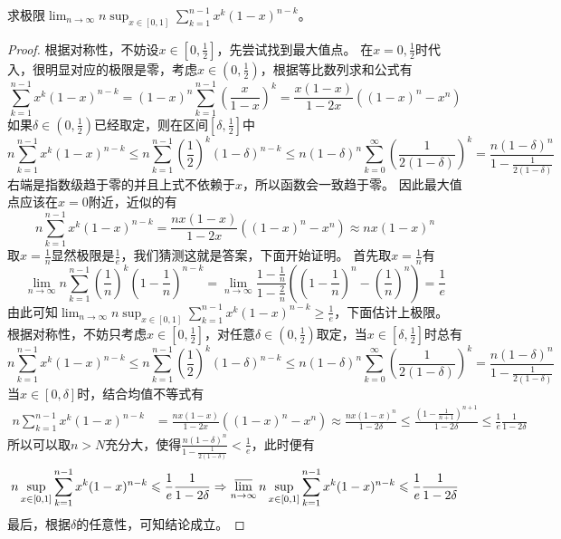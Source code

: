 \documentclass[../../main.tex]{subfiles}%
\begin{document}
\begin{example}
求极限\(\lim_{n\rightarrow\infty}n\sup_{x\in[0,1]}\sum_{k = 1}^{n - 1}x^{k}(1 - x)^{n - k}\)。
\end{example}
\begin{proof}
根据对称性，不妨设\(x\in\left[0,\frac{1}{2}\right]\)，先尝试找到最大值点。
在\(x = 0,\frac{1}{2}\)时代入，很明显对应的极限是零，考虑\(x\in\left(0,\frac{1}{2}\right)\)，根据等比数列求和公式有
\[
\sum_{k = 1}^{n - 1}x^{k}(1 - x)^{n - k}=(1 - x)^{n}\sum_{k = 1}^{n - 1}\left(\frac{x}{1 - x}\right)^{k}=\frac{x(1 - x)}{1 - 2x}((1 - x)^{n}-x^{n})
\]
如果\(\delta\in\left(0,\frac{1}{2}\right)\)已经取定，则在区间\(\left[\delta,\frac{1}{2}\right]\)中
\[
n\sum_{k = 1}^{n - 1}x^{k}(1 - x)^{n - k}\leqslant  n\sum_{k = 1}^{n - 1}\left(\frac{1}{2}\right)^{k}(1 - \delta)^{n - k}\leqslant  n(1 - \delta)^{n}\sum_{k = 0}^{\infty}\left(\frac{1}{2(1 - \delta)}\right)^{k}=\frac{n(1 - \delta)^{n}}{1-\frac{1}{2(1 - \delta)}}
\]
右端是指数级趋于零的并且上式不依赖于\(x\)，所以函数会一致趋于零。
因此最大值点应该在\(x = 0\)附近，近似的有
\[
n\sum_{k = 1}^{n - 1}x^{k}(1 - x)^{n - k}=\frac{nx(1 - x)}{1 - 2x}((1 - x)^{n}-x^{n})\approx nx(1 - x)^{n}
\]
取\(x = \frac{1}{n}\)显然极限是\(\frac{1}{e}\)，我们猜测这就是答案，下面开始证明。
首先取\(x = \frac{1}{n}\)有
\[
\lim_{n\rightarrow\infty}n\sum_{k = 1}^{n - 1}\left(\frac{1}{n}\right)^{k}\left(1-\frac{1}{n}\right)^{n - k}=\lim_{n\rightarrow\infty}\frac{1-\frac{1}{n}}{1-\frac{2}{n}}\left(\left(1-\frac{1}{n}\right)^{n}-\left(\frac{1}{n}\right)^{n}\right)=\frac{1}{e}
\]
由此可知\(\lim_{n\rightarrow\infty}n\sup_{x\in[0,1]}\sum_{k = 1}^{n - 1}x^{k}(1 - x)^{n - k}\geqslant \frac{1}{e}\)，下面估计上极限。
根据对称性，不妨只考虑\(x\in\left[0,\frac{1}{2}\right]\)，对任意\(\delta\in\left(0,\frac{1}{2}\right)\)取定，当\(x\in\left[\delta,\frac{1}{2}\right]\)时总有
\[
n\sum_{k = 1}^{n - 1}x^{k}(1 - x)^{n - k}\leqslant  n\sum_{k = 1}^{n - 1}\left(\frac{1}{2}\right)^{k}(1 - \delta)^{n - k}\leqslant  n(1 - \delta)^{n}\sum_{k = 0}^{\infty}\left(\frac{1}{2(1 - \delta)}\right)^{k}=\frac{n(1 - \delta)^{n}}{1-\frac{1}{2(1 - \delta)}}
\]
当\(x\in[0,\delta]\)时，结合均值不等式有
\begin{align*}
n\sum_{k = 1}^{n - 1}x^{k}(1 - x)^{n - k}&=\frac{nx(1 - x)}{1 - 2x}((1 - x)^{n}-x^{n})\approx\frac{nx(1 - x)^{n}}{1 - 2\delta}\leqslant \frac{\left(1-\frac{1}{n + 1}\right)^{n + 1}}{1 - 2\delta}\leqslant \frac{1}{e}\frac{1}{1 - 2\delta}
\end{align*}
所以可以取\(n > N\)充分大，使得\(\frac{n(1 - \delta)^{n}}{1-\frac{1}{2(1 - \delta)}}<\frac{1}{e}\)，此时便有
\[
n\sup_{x\in[0,1]}\sum_{k = 1}^{n - 1}x^{k}(1 - x)^{n - k}\leqslant \frac{1}{e}\frac{1}{1 - 2\delta}\Rightarrow\varlimsup_{n\rightarrow\infty}n\sup_{x\in[0,1]}\sum_{k = 1}^{n - 1}x^{k}(1 - x)^{n - k}\leqslant \frac{1}{e}\frac{1}{1 - 2\delta}
\]
最后，根据\(\delta\)的任意性，可知结论成立。
\end{proof}
\end{document}
